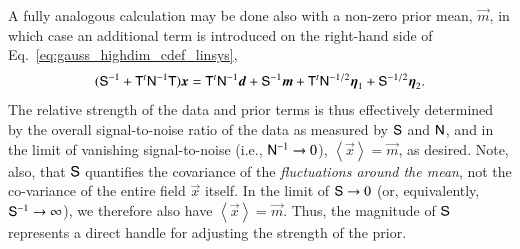 \documentclass[twocolumn]{aa}
\renewcommand{\d}[0]{\vec{d}}
\newcommand{\x}[0]{\vec{x}}
\newcommand{\m}[0]{\vec{m}}
\newcommand{\F}[0]{\tens{F}}
\newcommand{\T}[0]{\tens{T}}
\newcommand{\N}[0]{\tens{N}}
\newcommand{\I}[0]{\tens{I}}
\renewcommand{\S}[0]{\tens{S}}
\begin{document}
A fully analogous calculation may be done also with a non-zero prior
mean, $\m$, in which case an additional term is introduced on
the right-hand side of Eq.~\eqref{eq:gauss_highdim_cdef_linsys},
\begin{equation}
  (\S^{-1} + \T^t\N^{-1}\T)\x = \T^t\N^{-1}\d + \S^{-1}\m + \T^t\N^{-1/2}\vec{\eta}_1 +
    \S^{-1/2}\vec{\eta}_2. 
  \label{eq:gauss_highdim_prior}
\end{equation}
The relative strength of the data and prior terms is thus effectively
determined by the overall signal-to-noise ratio of the data as
measured by $\S$ and $\N$, and in the limit of vanishing
signal-to-noise (i.e., $\N^{-1}\rightarrow0$), $\left<\x\right>=\m$,
as desired. Note, also, that $\S$ quantifies the covariance of the
\emph{fluctuations around the mean}, not the co-variance of the entire
field $\x$ itself. In the limit of $\S\rightarrow0$ (or, equivalently,
$\S^{-1}\rightarrow\infty$), we therefore also have
$\left<\x\right>=\m$. Thus, the magnitude of $\S$ represents a direct
handle for adjusting the strength of the prior.



\end{document}
